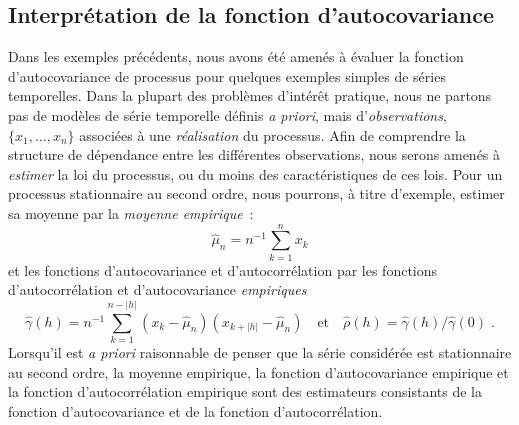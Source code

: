 \subsection{Interpr\'etation de la fonction d'autocovariance}
\label{sec:interp_cov} Dans les exemples pr\'ec\'edents, nous avons
\'et\'e amen\'es \`a \'evaluer la fonction d'autocovariance de processus pour
quelques exemples simples de s\'eries temporelles. Dans la plupart
des probl\`emes d'int\'er\^{e}t pratique, nous ne
partons pas de mod\`eles de s\'erie temporelle d\'efinis \emph{a
priori}, mais d'\emph{observations}, $\{ x_1, \dots, x_n\}$
associ\'ees \`a une \emph{r\'ealisation} du processus. Afin de
comprendre la structure de d\'ependance entre les diff\'erentes
observations, nous serons amen\'es \`a
\emph{estimer} la loi du processus, ou du moins des caract\'eristiques de ces lois.
Pour un processus stationnaire au second ordre, nous pourrons, \`a titre d'exemple, estimer
sa moyenne par la \emph{moyenne empirique}~:
\[
 \hat\mu_n = n^{-1} \sum_{k=1}^n x_k
\]
et les fonctions d'autocovariance et d'autocorr\'elation par les
fonctions d'autocorr\'elation et d'autocovariance \emph{empiriques}
\[
 \hat{\gamma}(h) = n^{-1} \sum_{k=1}^{n - |h|} (x_k - \hat\mu_n)(x_{k+|h|} - \hat\mu_n)
 \quad\mbox{et}\quad
 \hat{\rho}(h) = \hat{\gamma}(h) / \hat{\gamma}(0)\;.
\]
Lorsqu'il est \emph{a priori} raisonnable de penser que la s\'erie
consid\'er\'ee est stationnaire au second ordre, la moyenne empirique,
la fonction d'autocovariance empirique et la fonction
d'autocorr\'elation empirique sont des estimateurs consistants de la fonction d'autocovariance
et de la fonction d'autocorr\'elation.

